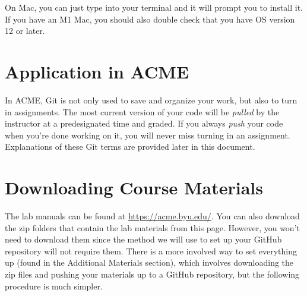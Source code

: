\else
On Mac, you can just type  into your terminal and it will prompt you to install it.
If you have an M1 Mac, you should also double check that you have OS version 12 or later.
\fi

\section*{Application in ACME}

In ACME, Git is not only used to save and organize your work, but also to turn in assignments.
The most current version of your code will be \emph{pulled} by the instructor at a predesignated time and graded.
If you always \emph{push} your code when you're done working on it, you will never miss turning in an assignment.
Explanations of these Git terms are provided later in this document.
\fi


\ifbyu  %
\section*{Downloading Course Materials}

The lab manuals can be found at 
\url{https://acme.byu.edu/}.
You can also download the zip folders that contain the lab materials from this page.
\ifbootcamp
However, you won't need to download them since the method we will use to set up your GitHub repository will not require them.
There is a more involved way to set everything up (found in the Additional Materials section), which involves downloading the zip files and pushing your materials up to a GitHub repository, but the following procedure is much simpler.
\fi

\ifbootcamp
